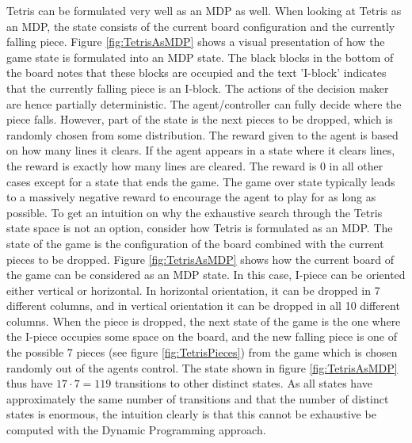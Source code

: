 Tetris can be formulated very well as an MDP as well.
When looking at Tetris as an MDP, the state consists
of the current board configuration and the currently falling piece.
Figure \ref{fig:TetrisAsMDP} shows a visual presentation 
of how the game state is formulated into an MDP state. The black
blocks in the bottom of the board notes that these blocks are 
occupied and the text 'I-block' indicates that the currently
falling piece is an I-block.
The actions of the decision maker are hence partially deterministic.
The agent/controller can fully decide where the piece falls. However,
part of the state is the next pieces to be dropped, which is
randomly chosen from some distribution. The reward given to the agent
is based on how many lines it clears. If the agent appears in a state 
where it clears lines, the reward is exactly how many lines are cleared.
The reward is 0 in all other cases except for a state that ends the game.
The game over state typically leads to a massively negative reward to 
encourage the agent to play for as long as possible.
To get an intuition on why the exhaustive search through the Tetris 
state space is not an option, consider how Tetris is formulated as an MDP.
The state of the game is the configuration of the board combined with 
the current pieces to be dropped. Figure \ref{fig:TetrisAsMDP} shows
how the current board of the game can be considered as an MDP state. 
In this case, I-piece can be oriented either vertical or horizontal. 
In horizontal orientation, it can be dropped in 7 different columns,
and in vertical orientation it can be dropped in all 10 different columns.
When the piece is dropped, the next state of the game is the one 
where the I-piece occupies some space on the board, and the new falling piece
is one of the possible 7 pieces (see figure \ref{fig:TetrisPieces}) 
from the game which is chosen randomly 
out of the agents control. The state shown in figure \ref{fig:TetrisAsMDP}
thus have $17 \cdot 7 = 119$ transitions to other distinct states.
As all states have approximately the same number of transitions
and that the number of distinct states is enormous, the intuition 
clearly is that this cannot be exhaustive be computed with the Dynamic 
Programming approach.
